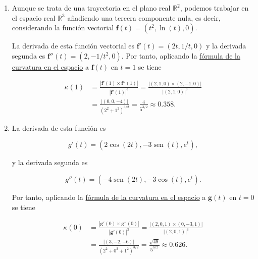 \documentclass[
  spanish,
  a4paper,
]{scrreport}
\theoremstyle{definition}
\theoremstyle{remark}
\begin{document}
\begin{tcolorbox}[enhanced jigsaw, arc=.35mm, bottomrule=.15mm, bottomtitle=1mm, breakable, colback=white, colbacktitle=quarto-callout-tip-color!10!white, colframe=quarto-callout-tip-color-frame, coltitle=black, left=2mm, leftrule=.75mm, opacityback=0, opacitybacktitle=0.6, rightrule=.15mm, title=\textcolor{quarto-callout-tip-color}{\faLightbulb}\hspace{0.5em}{Solución}, titlerule=0mm, toprule=.15mm, toptitle=1mm]

\begin{enumerate}
\def\labelenumi{\alph{enumi}.}
\item
  Aunque se trata de una trayectoria en el plano real \(\mathbb{R}^2\),
  podemos trabajar en el espacio real \(\mathbb{R}^3\) añadiendo una
  tercera componente nula, es decir, considerando la función vectorial
  \(\mathbf{f}(t) = (t^2, \ln(t), 0)\).

  La derivada de esta función vectorial es
  \(\mathbf{f}'(t) = (2t, 1/t, 0)\) y la derivada segunda es
  \(\mathbf{f}''(t) = (2, -1/t^2, 0)\). Por tanto, aplicando la
  \href{https://aprendeconalf.es/analisis-manual/12-funciones-vectoriales.html\#thm-curvatura-trayectoria-espacio-real}{fórmula
  de la curvatura en el espacio} a \(\mathbf{f}(t)\) en \(t=1\) se tiene

  \begin{align*}
  \kappa(1) &= 
  \frac{|\mathbf{f}'(1)\times \mathbf{f}''(1)|}{|\mathbf{f}'(1)|^3}
  = \frac{|(2,1,0)\times (2,-1,0)|}{|(2,1,0)|^3} \\
  & = \frac{|(0,0,-4)|}{(2^2+1^2)^{3/2}} 
  = \frac{4}{5^{3/2}} 
  \approx 0.358.
  \end{align*}
\item
  La derivada de esta función es

  \[
  g'(t) = (2\cos(2t), -3\operatorname{sen}(t), e^t),
  \]

  y la derivada segunda es

  \[
  g''(t) = (-4\operatorname{sen}(2t), -3\cos(t), e^t).
  \]

  Por tanto, aplicando la
  \href{https://aprendeconalf.es/analisis-manual/12-funciones-vectoriales.html\#thm-curvatura-trayectoria-espacio-real}{fórmula
  de la curvatura en el espacio} a \(\mathbf{g}(t)\) en \(t=0\) se tiene

  \begin{align*}
  \kappa(0) 
  &= \frac{|\mathbf{g}'(0)\times \mathbf{g}''(0)|}{|\mathbf{g}'(0)|^3} 
  = \frac{|(2,0,1)\times (0,-3,1)|}{|(2,0,1)|^3} \\
  &= \frac{|(3,-2,-6)|}{(2^2+0^2+1^2)^{3/2}}
  = \frac{\sqrt{49}}{5^{3/2}}
  \approx 0.626.
  \end{align*}
\end{enumerate}

\end{tcolorbox}
\end{document}
